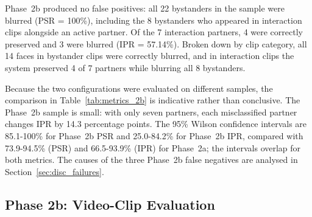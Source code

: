 \begin{table}[htbp]
\begin{singlespace}
\centering
\caption{Classification metrics for the Phase~2a and Phase~2b configurations.}
\label{tab:metrics_2b}
\renewcommand{\arraystretch}{1.3}
\end{singlespace}
\end{table}

Phase~2b produced no false positives: all 22 bystanders in the sample were blurred
(PSR = 100\%), including the 8 bystanders who appeared in interaction clips
alongside an active partner. Of the 7 interaction partners, 4 were correctly
preserved and 3 were blurred (IPR = 57.14\%). Broken down by clip category, all 14
faces in bystander clips were correctly blurred, and in interaction clips the
system preserved 4 of 7 partners while blurring all 8 bystanders.

Because the two configurations were evaluated on different samples, the
comparison in Table~\ref{tab:metrics_2b} is indicative rather than conclusive. The
Phase~2b sample is small: with only seven partners, each misclassified partner
changes IPR by 14.3 percentage points. The 95\% Wilson confidence intervals are
85.1-100\% for Phase~2b PSR and 25.0-84.2\% for Phase~2b IPR, compared with
73.9-94.5\% (PSR) and 66.5-93.9\% (IPR) for Phase~2a; the intervals overlap for
both metrics. The causes of the three Phase~2b false negatives are analysed in
Section~\ref{sec:disc_failures}.

\subsection{Phase 2b: Video-Clip Evaluation}
\label{sec:results_clips}

